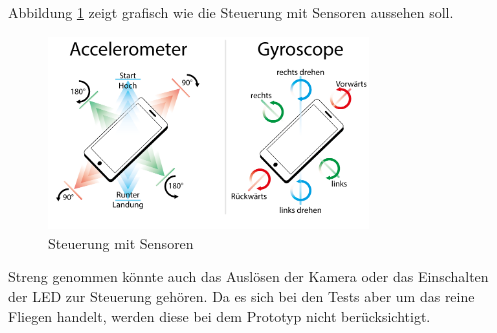 \documentclass{article}
\begin{document}
Abbildung \ref{fig:gameplay} zeigt grafisch wie die Steuerung mit Sensoren aussehen soll. 

\begin{figure}
\begin{minipage}[b]{1.0\linewidth}
  \centering
\centerline{\includegraphics[width= 85mm]{gameplay}}
\end{minipage}
\caption{Steuerung mit Sensoren}
\label{fig:gameplay}
\end{figure}


Streng genommen könnte auch das Auslösen der Kamera oder das Einschalten der LED zur Steuerung gehören. Da es sich bei den Tests aber um das reine Fliegen handelt, werden diese bei dem Prototyp nicht berücksichtigt.
\end{document}
